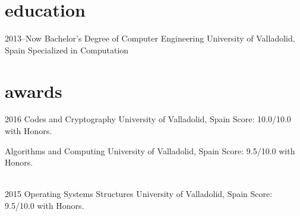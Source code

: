 \documentclass[]{friggeri-cv} %
\begin{document}



    \section{education}

        \begin{entrylist}

            \entry
            {2013--Now}
            {Bachelor's Degree {\normalfont of Computer Engineering}}
            {University of Valladolid, Spain}
            {Specialized in Computation}

        \end{entrylist}




    \section{awards}

        \begin{entrylist}

            \entry
            {2016}
            {Codes and Cryptography}
            {University of Valladolid, Spain}
            {Score: 10.0/10.0 with Honors.}

            \entry
            {}
            {Algorithms and Computing}
            {University of Valladolid, Spain}
            {Score: 9.5/10.0 with Honors.}

            \\
            \entry
            {2015}
            {Operating Systems Structures}
            {University of Valladolid, Spain}
            {Score: 9.5/10.0 with Honors.}

        \end{entrylist}



\end{document}

